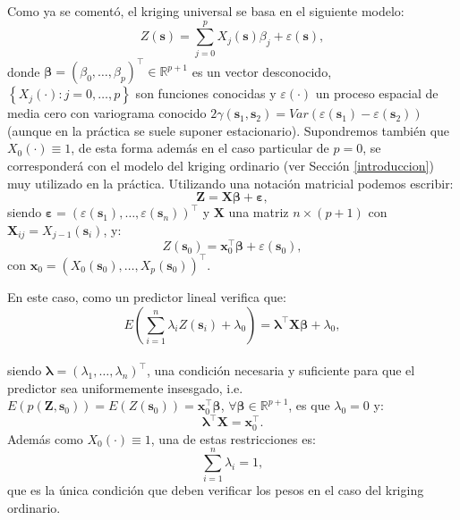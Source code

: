 \documentclass[
]{book}
\theoremstyle{break}
\theoremstyle{definition}
\theoremstyle{definition}
\theoremstyle{definition}
\theoremstyle{definition}
\theoremstyle{remark}
\begin{document}
Como ya se comentó, el kriging universal se basa en el siguiente modelo:
\[Z(\mathbf{s}) = \sum\limits_{j=0}^{p}X_{j}(\mathbf{s})\beta_{j} + \varepsilon(\mathbf{s}),\]
donde \(\boldsymbol{\beta}=(\beta_{0}, \ldots, \beta_{p})^\top \in \mathbb{R}^{p+1}\) es un vector desconocido, \(\left\{ X_{j}(\cdot):j=0, \ldots,p\right\}\) son funciones conocidas y \(\varepsilon(\cdot)\) un proceso espacial de media cero con variograma conocido \(2\gamma(\mathbf{s}_{1},\mathbf{s}_{2}) = Var(\varepsilon(\mathbf{s}_{1})-\varepsilon(\mathbf{s}_{2}))\) (aunque en la práctica se suele suponer estacionario).
Supondremos también que \(X_{0} (\cdot)\equiv 1\), de esta forma además en el caso particular de \(p=0\), se corresponderá con el modelo del kriging ordinario (ver Sección \ref{introduccion}) muy utilizado en la práctica.
Utilizando una notación matricial podemos escribir:
\[\mathbf{Z}=\mathbf{X}\boldsymbol{\beta}+\boldsymbol{\varepsilon},\]
siendo \(\boldsymbol{\varepsilon}=\left( \varepsilon(\mathbf{s}_{1}), \ldots, \varepsilon(\mathbf{s}_{n} )\right)^\top\) y \(\mathbf{X}\) una matriz \(n\times (p+1)\) con \(\mathbf{X}_{ij} =X_{j-1} (\mathbf{s}_{i})\), y:
\[Z(\mathbf{s}_{0})=\mathbf{x}_0^\top\boldsymbol{\beta}+\varepsilon(\mathbf{s}_{0}),\]
con \(\mathbf{x}_0=\left(X_{0}(\mathbf{s}_{0}), \ldots, X_{p}(\mathbf{s}_{0})\right)^\top\).

En este caso, como un predictor lineal verifica que:
\[E\left( \sum\limits_{i=1}^{n}\lambda_{i} Z(\mathbf{s}_{i}) +\lambda_{0} \right) = \boldsymbol{\lambda}^\top \mathbf{X}\boldsymbol{\beta}+\lambda_{0},\]\\
siendo \(\boldsymbol{\lambda}=\left( \lambda_{1}, \ldots,\lambda_{n} \right)^\top\), una condición necesaria y suficiente para que el predictor sea uniformemente insesgado, i.e.~\(E(p(\mathbf{Z},\mathbf{s}_{0}))=E(Z(\mathbf{s}_{0}))=\mathbf{x}_0^\top\boldsymbol{\beta}\), \(\forall \boldsymbol{\beta}\in \mathbb{R}^{p+1}\), es que \(\lambda_{0} =0\) y:
\begin{equation}
  \boldsymbol{\lambda}^\top \mathbf{X} = \mathbf{x}_0^\top.
  \label{eq:resticciones-ku}
\end{equation}
Además como \(X_{0} (\cdot)\equiv 1\), una de estas restricciones es:
\begin{equation}
  \sum\limits_{i=1}^{n}\lambda_{i} = 1,
  \label{eq:resticcion-ko}
\end{equation}
que es la única condición que deben verificar los pesos en el caso del kriging ordinario.
\end{document}
